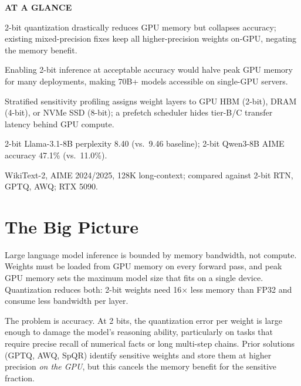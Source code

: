 \documentclass[10pt,twocolumn]{article}
\begin{document}
\begin{mdframed}[backgroundcolor=boxgray,linecolor=rulered,linewidth=1pt,
    innerleftmargin=6pt,innerrightmargin=6pt,
    innertopmargin=6pt,innerbottommargin=6pt]
\textbf{\small AT A GLANCE}\par\vspace{4pt}
\begin{description}[leftmargin=0pt,labelsep=4pt,itemsep=2pt,parsep=0pt,
    font=\small\bfseries]
  \item[Problem:] 2-bit quantization drastically reduces GPU memory
    but collapses accuracy; existing mixed-precision fixes keep all
    higher-precision weights on-GPU, negating the memory benefit.
  \item[Why it matters:] Enabling 2-bit inference at acceptable accuracy
    would halve peak GPU memory for many deployments, making 70B+
    models accessible on single-GPU servers.
  \item[Method:] Stratified sensitivity profiling assigns weight layers
    to GPU HBM (2-bit), DRAM (4-bit), or NVMe SSD (8-bit); a prefetch
    scheduler hides tier-B/C transfer latency behind GPU compute.
  \item[Result:] 2-bit Llama-3.1-8B perplexity 8.40 (vs.\ 9.46
    baseline); 2-bit Qwen3-8B AIME accuracy 47.1\% (vs.\ 11.0\%).
  \item[Evidence:] WikiText-2, AIME 2024/2025, 128K long-context;
    compared against 2-bit RTN, GPTQ, AWQ; RTX 5090.
\end{description}
\end{mdframed}

\section{The Big Picture}

Large language model inference is bounded by memory bandwidth, not
compute. Weights must be loaded from GPU memory on every forward pass,
and peak GPU memory sets the maximum model size that fits on a single
device. Quantization reduces both: 2-bit weights need 16$\times$ less
memory than FP32 and consume less bandwidth per layer.

The problem is accuracy. At 2 bits, the quantization error per weight
is large enough to damage the model's reasoning ability, particularly
on tasks that require precise recall of numerical facts or long
multi-step chains. Prior solutions (GPTQ, AWQ, SpQR) identify sensitive
weights and store them at higher precision \emph{on the GPU}, but this
cancels the memory benefit for the sensitive fraction.
\end{document}
